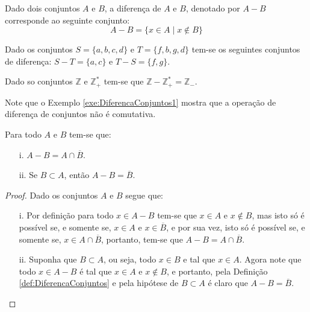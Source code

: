 \begin{definition}\label{def:DiferencaConjuntos}
	Dado dois conjuntos $A$ e $B$, a diferença de $A$ e $B$, denotado por $A - B$ corresponde ao seguinte conjunto:
	$$A - B = \{x \in A \mid x \notin B\}$$
\end{definition}

\begin{example}\label{exe:DiferencaConjuntos1}
	Dado os conjuntos $S = \{a, b, c, d\}$ e $T = \{f, b, g, d\}$ tem-se os seguintes conjuntos de diferença: $S - T = \{a, c\}$ e $T - S = \{f, g\}$.
\end{example}

\begin{example}\label{exe:DiferencaConjuntos2}
	Dado so conjuntos $\mathbb{Z}$ e $\mathbb{Z}_+^*$ tem-se que $\mathbb{Z} - \mathbb{Z}_+^* = \mathbb{Z}_-$.
\end{example}

\begin{remark}
	Note que o Exemplo \ref{exe:DiferencaConjuntos1} mostra que a operação de diferença de conjuntos não é comutativa.
\end{remark}

\begin{theorem}\label{teo:BasicoDiferencaConjuntos}
	Para todo $A$ e $B$ tem-se que:
	\begin{itemize}
		\item[i.] $A - B = A \cap \overline{B}$.
		\item[ii.] Se $B \subset A$, então $A - B = \overline{B}$.
	\end{itemize}
\end{theorem}

\begin{proof}
	Dado os conjuntos $A$ e $B$ segue que:
	\begin{itemize}
		\item[i.] Por definição para todo $x \in A - B$ tem-se que $x \in A$ e $x \notin B$, mas isto só é possível se, e somente se, $x \in A$ e $x \in \overline{B}$, e por sua vez, isto só é possível se, e somente se, $x \in A \cap \overline{B}$, portanto, tem-se que $A - B = A \cap \overline{B}$.
		\item[ii.] Suponha que $B \subset A$, ou seja, todo $x \in B$ e tal que $x \in A$. Agora note que todo $x \in A - B$ é tal que $x \in A$ e $x \notin B$, e portanto, pela Definição \ref{def:DiferencaConjuntos} e pela hipótese de $B \subset A$ é claro que $A - B = \overline{B}$.
	\end{itemize}
\end{proof}

